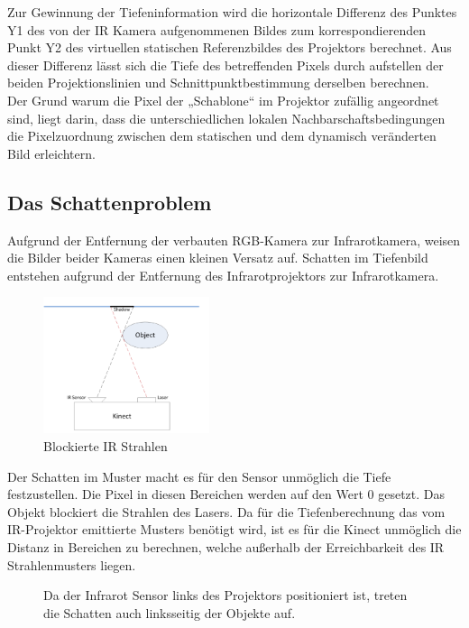 Zur Gewinnung der Tiefeninformation wird die horizontale Differenz des Punktes Y1 des von der IR Kamera aufgenommenen Bildes zum korrespondierenden Punkt Y2 des virtuellen statischen Referenzbildes des Projektors berechnet. Aus dieser Differenz lässt sich die Tiefe des betreffenden Pixels durch aufstellen der beiden Projektionslinien und Schnittpunktbestimmung derselben berechnen. \\
Der Grund warum die Pixel der „Schablone“ im Projektor zufällig angeordnet sind, liegt darin, dass die unterschiedlichen lokalen Nachbarschaftsbedingungen die Pixelzuordnung zwischen dem statischen und dem dynamisch veränderten Bild erleichtern.


\subsection{Das Schattenproblem}

Aufgrund der Entfernung der verbauten RGB-Kamera zur Infrarotkamera, weisen die Bilder beider Kameras einen kleinen Versatz auf.
Schatten im Tiefenbild entstehen aufgrund der Entfernung des Infrarotprojektors zur Infrarotkamera.
\begin{figure}
  \vspace{-20pt}
  \begin{center}
       \includegraphics[height=4cm]{Res/Schatten_Strahl.png}
  \end{center}
  \vspace{-20pt}
  \caption{Blockierte IR Strahlen }
  \vspace{-10pt}
\end{figure}
Der Schatten im Muster macht es für den Sensor unmöglich die Tiefe festzustellen. Die Pixel in diesen Bereichen werden auf den Wert 0 gesetzt.
Das Objekt blockiert die Strahlen des Lasers. Da für die Tiefenberechnung das vom IR-Projektor emittierte Musters benötigt wird, ist es für die Kinect unmöglich die Distanz in Bereichen zu berechnen, welche außerhalb der Erreichbarkeit des IR Strahlenmusters liegen. \\
\begin{figure}[!ht]
  \centering
   \caption{Da der Infrarot Sensor links des Projektors positioniert ist, treten die Schatten auch linksseitig der Objekte auf.  }
\end{figure}